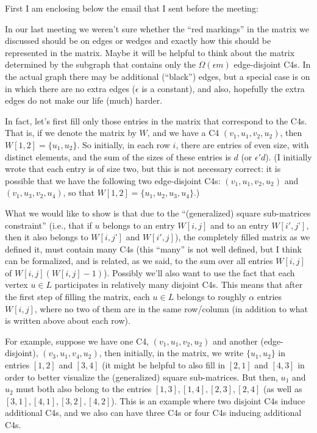 \documentclass{article}
\newcommand{\eps}{\epsilon}
\begin{document}
First I am enclosing below the email that I sent before the meeting:

In our last meeting we weren't sure whether the ``red markings” in the matrix we discussed should be on edges or wedges and exactly how this should be represented in the matrix. Maybe it will be helpful to think about the matrix determined by the subgraph that contains only the $\Omega(\eps m)$ edge-disjoint C4s. In the actual graph there may be additional (“black”) edges, but a special case is on in which there are no extra edges ($\eps$ is a constant), and also, hopefully the extra edges do not make our life (much) harder.

In fact, let’s first fill only those entries in the matrix that correspond to the C4s. That is, if we denote the matrix by $W$, and we have a C4 $(v_1,u_1,v_2,u_2)$, then $W[1,2] = \{u_1,u_2\}$. So initially, in each row $i$, there are entries of even size, with distinct elements, and the sum of the sizes of these entries is $d$ (or $\eps' d$). (I initially wrote that each entry is of size two, but this is not necessary correct: it is possible that we have the following two edge-disjoint C4s: $(v_1,u_1,v_2,u_2)$ and $(v_1,u_3,v_2,u_4)$, so that $W[1,2] = \{u_1,u_2,u_3,u_4\}$.)

What we would like to show is that due to the ``(generalized) square sub-matrices constraint” (i.e., that if $u$ belongs to an entry $W[i,j]$ and to an entry $W[i',j’]$, then it also belongs to $W[i,j’]$ and $W[i',j]$), the completely filled matrix as we defined it, must contain many C4s (this ``many” is not well defined, but I think can be formalized, and is related, as we said, to the sum over all entries $W[i,j]$ of $W[i,j](W[i,j]-1)$). Possibly we’ll also want to use the fact that each  vertex $u \in L$ participates in relatively many disjoint C4s. This means that after the first step of filling the matrix, each $u\in L$ belongs to roughly $\alpha$ entries $W[i,j]$, where no two of them are in the same row/column (in addition to what is written above about each row).

For example, suppose we have one C4, $(v_1,u_1,v_2,u_2)$ and another (edge-disjoint), $(v_3,u_1,v_4,u_2)$, then initially, in the matrix, we write $\{u_1,u_2\}$ in entries $[1,2]$ and $[3,4]$ (it might be helpful to also fill in $[2,1]$ and $[4,3]$ in order to better visualize the (generalized) square sub-matrices. But then, $u_1$ and $u_2$ must both also belong to the entries $[1,3],[1,4],[2,3],[2,4]$ (as well as $[3,1],[4,1],[3,2],[4,2]$). This is an example where two disjoint C4s induce additional C4s, and we also can have three C4s or four C4s inducing additional C4s.
\end{document}
